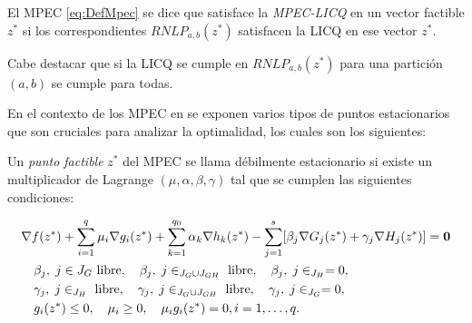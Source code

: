 \begin{definition}
El MPEC \eqref{eq:DefMpec} se dice que satisface la \textit{MPEC-LICQ}  en un vector factible $z^*$ si los correspondientes $RNLP_{a,b}(z^*)$ satisfacen la LICQ  en ese vector $z^*$.
\end{definition}
    Cabe destacar que si la LICQ se cumple en  $RNLP_{a,b}(z^*)$ para una partición $(a,b)$ se cumple para todas. 

En el contexto de los MPEC en \cite{Flegel2003AFJ} se exponen varios tipos de puntos estacionarios que son cruciales para analizar la optimalidad, los cuales son los siguientes:
\begin{definition}
    Un \textit{punto factible} $z^*$ del MPEC se llama débilmente estacionario si existe un multiplicador de Lagrange $ (\mu, \alpha, \beta, \gamma)$ tal que se cumplen las siguientes condiciones:
    
\begin{align}
& \nabla f(z^*) + \sum_{i=1}^q \mu_i\nabla g_i(z^*) + \sum_{k=1}^{q_0} \alpha_k\nabla h_k(z^*) - \sum_{j=1}^{s} [\beta_j\nabla G_j(z^*) + \gamma_j\nabla H_j(z^*)] = \vec{0} \notag\\
    & \quad \begin{aligned}
        & \beta_j,\; j\in {J_G} \text{ libre}, \quad  \beta_j,\; j\in _{J_G\cup J_{GH}} \text{ libre}, \quad \beta_j,\; j\in _{J_H}= 0, \\
        &  \gamma_j,\; j\in _{J_H} \text{ libre}, \quad  \gamma_j,\; j\in _{J_G\cup J_{GH}} \text{ libre}, \quad \gamma_j,\; j\in _{J_G}= 0,  \\
        & g_i(z^*) \leq 0, \quad \mu_i \geq 0, \quad \mu_i g_i(z^*) = 0, i=1,\ldots, q.
    \end{aligned} \\
& \label{eq:Definición_punto_debilemente_estacionario} \notag
\end{align}
\end{definition}

